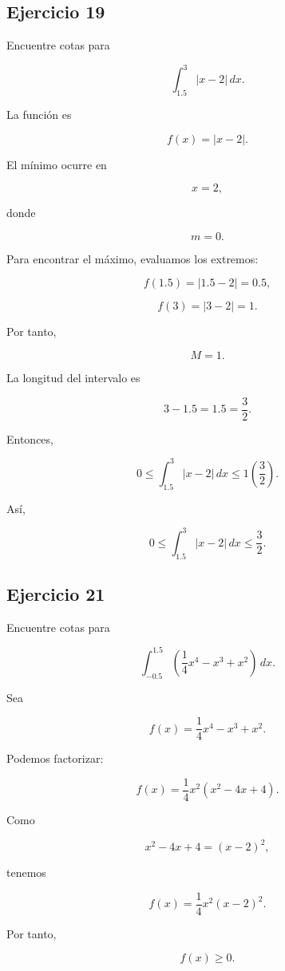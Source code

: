 \documentclass[12pt]{article}
\begin{document}
\subsection*{Ejercicio 19}

Encuentre cotas para

\[
\int_{1.5}^{3}|x-2|\,dx.
\]

La función es

\[
f(x)=|x-2|.
\]

El mínimo ocurre en

\[
x=2,
\]

donde

\[
m=0.
\]

Para encontrar el máximo, evaluamos los extremos:

\[
f(1.5)=|1.5-2|=0.5,
\]

\[
f(3)=|3-2|=1.
\]

Por tanto,

\[
M=1.
\]

La longitud del intervalo es

\[
3-1.5=1.5=\frac32.
\]

Entonces,

\[
0
\leq
\int_{1.5}^3|x-2|\,dx
\leq
1\left(\frac32\right).
\]

Así,

\[
\boxed{
0
\leq
\int_{1.5}^3|x-2|\,dx
\leq
\frac32
}.
\]

\subsection*{Ejercicio 21}

Encuentre cotas para

\[
\int_{-0.5}^{1.5}
\left(
\frac14x^4-x^3+x^2
\right)\,dx.
\]

Sea

\[
f(x)
=
\frac14x^4-x^3+x^2.
\]

Podemos factorizar:

\[
f(x)
=
\frac14x^2(x^2-4x+4).
\]

Como

\[
x^2-4x+4=(x-2)^2,
\]

tenemos

\[
f(x)
=
\frac14x^2(x-2)^2.
\]

Por tanto,

\[
f(x)\geq0.
\]
\end{document}
